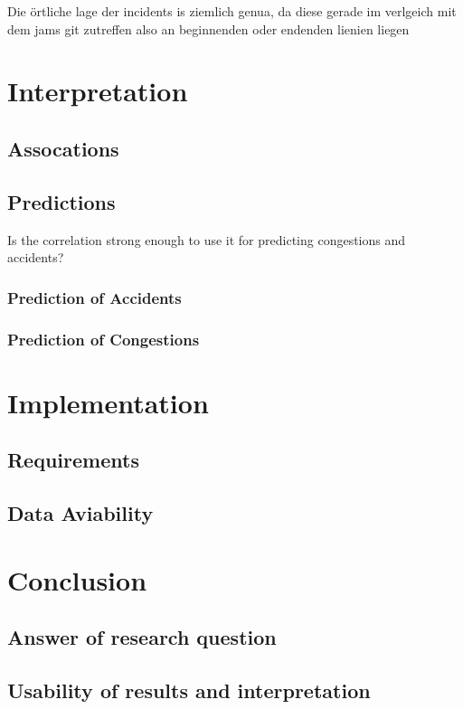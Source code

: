\documentclass[a4paper,headsepline,footsepline,fontsize=11pt,BCOR=12mm,DIV=12]{report}
\begin{document}
Die örtliche lage der incidents is ziemlich genua, da diese gerade im verlgeich mit dem jams git zutreffen also an beginnenden oder endenden lienien liegen

\chapter{Interpretation}

\section{Assocations}

\section{Predictions}
Is the correlation strong enough to use it for predicting congestions and accidents?

\subsection{Prediction of Accidents}

\subsection{Prediction of Congestions}

\chapter{Implementation}

\section{Requirements}

\section{Data Aviability}

\chapter{Conclusion}

\section{Answer of research question}

\section{Usability of results and interpretation}
\end{document}
